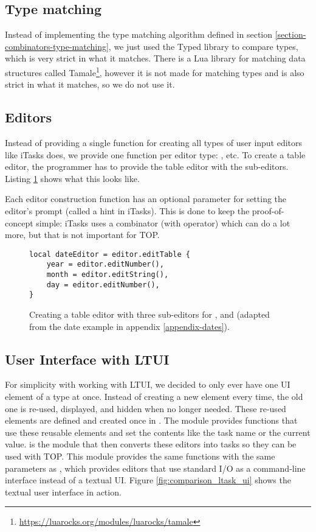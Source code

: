\subsection{Type matching}
Instead of implementing the type matching algorithm defined in section \ref{section-combinators-type-matching}, we just used the Typed library to compare types, which is very strict in what it matches. There is a Lua library for matching data structures called Tamale\footnote{\url{https://luarocks.org/modules/luarocks/tamale}}, however it is not made for matching types and is also strict in what it matches, so we do not use it.

\subsection{Editors}
Instead of providing a single function for creating all types of user input editors like iTasks does, we provide one function per editor type: ,  etc. To create a table editor, the programmer has to provide the table editor with the sub-editors. Listing \ref{lst:ltasks_editors_table} shows what this looks like.

Each editor construction function has an optional parameter for setting the editor's prompt (called a hint in iTasks). This is done to keep the proof-of-concept simple: iTasks uses a  combinator (with  operator) which can do a lot more, but that is not important for TOP.

\begin{figure}[ht]
\centering
\begin{verbatim}
local dateEditor = editor.editTable {
    year = editor.editNumber(),
    month = editor.editString(),
    day = editor.editNumber(),
}
\end{verbatim}
\caption{Creating a table editor with three sub-editors for ,  and  (adapted from the date example in appendix \ref{appendix-dates}).}
\label{lst:ltasks_editors_table}
\end{figure}

\subsection{User Interface with LTUI}
For simplicity with working with LTUI, we decided to only ever have one UI element of a type at once. Instead of creating a new element every time, the old one is re-used, displayed, and hidden when no longer needed. These re-used elements are defined and created once in .
The module  provides functions that use these reusable elements and set the contents like the task name or the current value.
 is the module that then converts these editors into tasks so they can be used with TOP. This module provides the same functions with the same parameters as , which provides editors that use standard I/O as a command-line interface instead of a textual UI. Figure \ref{fig:comparison_ltask_ui} shows the textual user interface in action.


